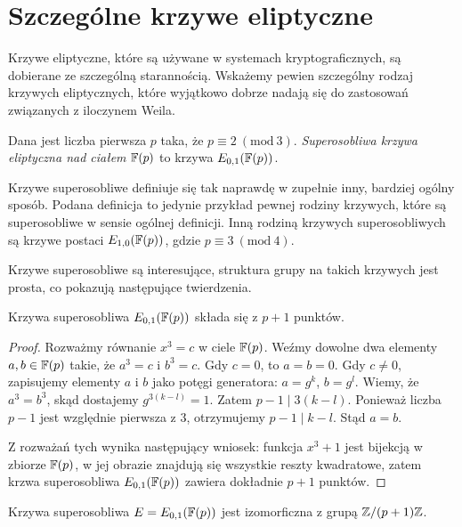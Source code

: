 \section{Szczególne krzywe eliptyczne}

Krzywe eliptyczne, które są używane w systemach kryptograficznych,
są dobierane ze szczególną starannością.
Wskażemy pewien szczególny rodzaj krzywych eliptycznych,
które wyjątkowo dobrze nadają się do zastosowań
związanych z iloczynem Weila.

\begin{definition}
Dana jest liczba pierwsza $p$ taka, że $p \equiv 2\ (\mathrm{mod}\ 3)$.
\emph{Superosobliwa krzywa eliptyczna nad ciałem $\mathbb{F}(p)$}
to krzywa $E_{0,1}(\mathbb{F}(p))$.
\end{definition}

\begin{remark}
Krzywe superosobliwe definiuje się tak naprawdę w zupełnie inny,
bardziej ogólny sposób. Podana definicja to jedynie przykład
pewnej rodziny krzywych, które są superosobliwe w sensie ogólnej definicji.
Inną rodziną krzywych superosobliwych są krzywe postaci $E_{1,0}(\mathbb{F}(p))$,
gdzie $p \equiv 3\ (\mathrm{mod}\ 4)$.
\end{remark}

Krzywe superosobliwe są interesujące,
struktura grupy na takich krzywych jest prosta,
co pokazują następujące twierdzenia.

\begin{theorem}
Krzywa superosobliwa $E_{0,1}(\mathbb{F}(p))$ składa się z $p + 1$ punktów.
\end{theorem}

\begin{proof}
Rozważmy równanie $x^3 = c$ w ciele $\mathbb{F}(p)$.
Weźmy dowolne dwa elementy $a, b \in \mathbb{F}(p)$ takie, że $a^3 = c$ i $b^3 = c$.
Gdy $c = 0$, to $a = b = 0$.
Gdy $c \neq 0$, zapisujemy elementy $a$ i $b$ jako potęgi generatora:
$a = g^k$, $b = g^l$.
Wiemy, że $a^3 = b^3$, skąd dostajemy $g^{3(k-l)} = 1$.
Zatem $p-1 \mid 3(k-l)$.
Ponieważ liczba $p-1$ jest względnie pierwsza z $3$,
otrzymujemy $p-1 \mid k-l$.
Stąd $a = b$.

Z rozważań tych wynika następujący wniosek:
funkcja $x^3 + 1$ jest bijekcją w zbiorze $\mathbb{F}(p)$,
w jej obrazie znajdują się wszystkie reszty kwadratowe,
zatem krzwa superosobliwa $E_{0,1}(\mathbb{F}(p))$ zawiera dokładnie $p+1$ punktów.
\end{proof}

\begin{theorem}
Krzywa superosobliwa $E = E_{0,1}(\mathbb{F}(p))$
jest izomorficzna z grupą $\mathbb{Z} / (p+1)\mathbb{Z}$.
\end{theorem}

